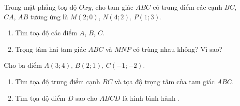 \begin{bt}%
	Trong mặt phẳng toạ độ $Oxy$, cho tam giác $ABC$ có trung điểm các cạnh $BC$, $CA$, $AB$ tương ứng là $M(2;0)$, $N(4;2)$, $P(1;3)$.
	\begin{enumerate}
		\item Tìm toạ độ các điểm $A$, $B$, $C$.
		\item Trọng tâm hai tam giác $ABC$ và $MNP$ có trùng nhau không? Vì sao?
	\end{enumerate}
\end{bt}

\begin{bt}%
	Cho ba điểm $A(3;4)$, $B(2;1)$, $C(-1;-2)$.
	\begin{enumerate}
		\item Tìm tọa độ trung điểm cạnh $BC$ và tọa độ trọng tâm của tam giác $ABC$.
		\item Tìm tọa độ điểm $D$ sao cho $ABCD$ là hình bình hành .
	\end{enumerate}
\end{bt}

